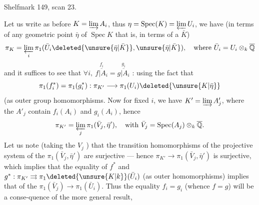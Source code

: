 Shelfmark 149, scan 23.

Let us write as before $K=\varinjlim A_i$, thus  $\eta=\operatorname{Spec}(K)=\varprojlim U_i$, we have (in terms of any geometric point $\bar\eta$ of $\operatorname{Spec}K$ that is, in terms of a $\bar K$)
\[
\pi_K=\varprojlim_i\pi_1(\bar U_i\deleted{\unsure{\bar\eta|\bar K}},\unsure{\bar\eta|\bar K}),\quad\text{where }\bar U_i=U_i\otimes_k\overline{\mathbb Q}
\]
and it suffices to see that $\forall i,\ \overset{f_i}{\overline{f|A_i}}=\overset{g_i}{\overline{g|A_i}}$ : using the fact that
\[
\pi_1(f_i^*)=\pi_1(g_i^*):\pi_{K'}\longrightarrow\pi_1(U_i)\deleted{\unsure{K|\bar\eta}}
\]
(as outer group homomorphisms. Now for fixed $i$, we have $K'=\varinjlim A'_j$, where the $A'_j$ contain $f_i(A_i)$ and $g_i(A_i)$, hence
\[
\pi_{K'}=\varprojlim_j\pi_1(\bar V_j,\bar\eta'),\quad\text{with }\bar V_j=\operatorname{Spec}(A_j)\otimes_k\overline{\mathbb Q}.
\]
Let us note (taking the $V_j$ ) that the transition homomorphisms of the projective system of the $\pi_1(\bar V_j,\bar\eta')$ are surjective --- hence $\pi_{K'}\longrightarrow\pi_1(\bar V_j,\bar\eta')$ is surjective, which implies that the equality of $f^*$ and $g^*:\pi_{K'}\rightrightarrows\pi_1\deleted{\unsure{K|k}}(\bar U_i)$ (as outer homomorphisms) implies that of the $\pi_1(\bar V_j)\longrightarrow\pi_1(\bar U_i)$.
Thus the equality $f_i=g_i$ (whence $f=g$) will be a conse-quence of the more general result,
